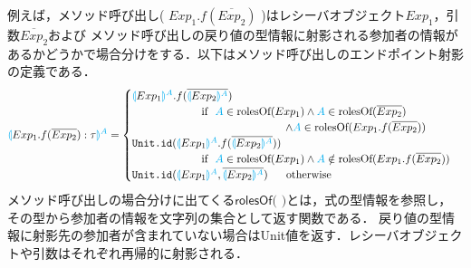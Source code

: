 \documentclass{thesis}
\newcommand{\projection}[2]{{\color{cyan}\llparenthesis}#1{\color{cyan}\rrparenthesis^#2}}
\newcommand{\mblue}[1]{\textbf{\textsf{\color{MidnightBlue}#1}}}
\newcommand{\cyan}[1]{\color{cyan}#1}
\begin{document}
例えば，メソッド呼び出し( $Exp_1.f(\overline{Exp_2})$ )はレシーバオブジェクト$Exp_1$，引数$\overline{Exp_2}$および
メソッド呼び出しの戻り値の型情報に射影される参加者の情報があるかどうかで場合分けをする．以下はメソッド呼び出しのエンドポイント射影の定義である．
\begin{alignat*}{2} 
  &\projection{Exp_1.f(\overline{Exp_2}):\tau}{A}=
  \begin{cases}
    \projection{Exp_1}{A}.f(\overline{\projection{Exp_2}{A}}) \\
    ~~~~~~~~~~~~~~~~~~~\text{if}~~ {\color{cyan}A} \in \text{rolesOf}(Exp_1) \wedge {\color{cyan}A} \in \text{rolesOf}(\overline{Exp_2})\\
    ~~~~~~~~~~~~~~~~~~~~~~~~~~~~~~~~~~~~~~~~~~ \wedge {\color{cyan}A} \in \text{rolesOf}(Exp_1.f(\overline{Exp_2}))\\
    \texttt{Unit.id}(\projection{Exp_1}{A}.f(\overline{\projection{Exp_2}{A}})) \\
    ~~~~~~~~~~~~~~~~~~~\text{if}~~ {\color{cyan}A} \in \text{rolesOf}(Exp_1) \wedge {\color{cyan}A} \notin \text{rolesOf}(Exp_1.f(\overline{Exp_2}))\\
    \texttt{Unit.id}(\projection{Exp_1}{A},\overline{\projection{Exp_2}{A}}) ~~~~~\text{otherwise}
  \end{cases}\\
\end{alignat*}
メソッド呼び出しの場合分けに出てくる$\textsf{rolesOf(~)}$とは，式の型情報を参照し，その型から参加者の情報を文字列の集合として返す関数である．
戻り値の型情報に射影先の参加者が含まれていない場合は\textsf{Unit}値を返す．レシーバオブジェクトや引数はそれぞれ再帰的に射影される．
\end{document}

